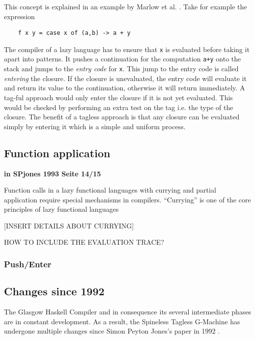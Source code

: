 \documentclass[runningheads]{llncs}
\begin{document}
This concept is explained in an example by Marlow et al. \cite{marlow2007faster}. Take for example the expression

\begin{center}
	\begin{BVerbatim}
	f x y = case x of (a,b) -> a + y
	\end{BVerbatim}
\end{center}

The compiler of a lazy language has to ensure that \texttt{x} is evaluated before taking it apart into patterns. It pushes a continuation for the computation \texttt{a+y} onto the stack and jumps to the \textit{entry code} for \texttt{x}. This jump to the entry code is called \textit{entering} the closure. If the closure is unevaluated, the entry code will evaluate it and return its value to the continuation, otherwise it will return immediately.
A tag-ful approach would only enter the closure if it is not yet evaluated. This would be checked by performing an extra test on the tag i.e. the type of the closure. The benefit of a tagless approach is that any closure can be evaluated simply by entering it which is a simple and uniform process. \cite{marlow2007faster}



\subsection{Function application}
\textbf{in SPjones 1993 Seite 14/15}

Function calls in a lazy functional languages with currying and partial application require special mechanisms in compilers.
\enquote{Currying} is one of the core principles of lazy functional languages 

[INSERT DETAILS ABOUT CURRYING]


HOW TO INCLUDE THE EVALUATION TRACE?


\subsubsection{Push/Enter}


\subsection{Changes since 1992}
The Glasgow Haskell Compiler and in consequence its several intermediate phases are in constant development. As a result, the Spineless Tagless G-Machine has undergone multiple changes since Simon Peyton Jones's paper in 1992 \cite{jones1992implementing}. 
\end{document}
